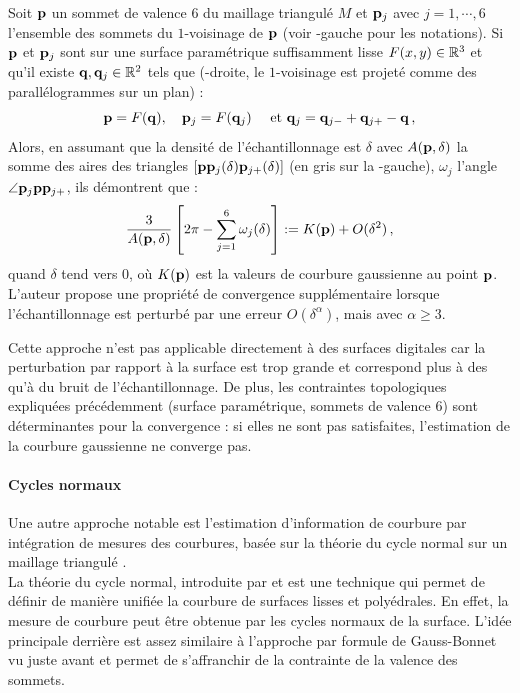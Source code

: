 Soit $\mathbf{p}$ un sommet de valence $6$ du maillage triangulé $M$ et $\mathbf{p}_j$ avec
$j = 1,\cdots, 6$ l'ensemble des sommets du $1$-voisinage de $\mathbf{p}$ (voir
-gauche pour les notations). Si $\mathbf{p}$ et $\mathbf{p}_j$
sont sur une surface paramétrique suffisamment lisse $F(x,y) \in \mathbb{R}^3$ et
qu'il existe $\mathbf{q}, \mathbf{q}_j \in \mathbb{R}^2$ tels que
(-droite, le $1$-voisinage est projeté comme des
parallélogrammes sur un plan) :
%
\begin{equation}
  \mathbf{p}=F(\mathbf{q}), \quad \mathbf{p}_j=F(\mathbf{q}_j) \quad \text{~et~} \mathbf{q}_j=\mathbf{q}_{j-} + \mathbf{q}_{j+} - \mathbf{q} \,,
\end{equation}
%
Alors, en assumant que la densité de l’échantillonnage est $\delta$ avec $A(\mathbf{p}, \delta)$ la somme des aires des triangles
$[\mathbf{p}\mathbf{p}_j(\delta)\mathbf{p}_{j+}(\delta)]$ (en gris sur la
-gauche), $\omega_j$ l'angle $\angle
\mathbf{p}_j\mathbf{p}\mathbf{p}_{j+}$, ils démontrent que :
%
\begin{equation}
  \frac{3}{A(\mathbf{p},\delta)} \left[ 2\pi - \sum \limits^6_{j=1} \omega_j(\delta) \right] := K(\mathbf{p}) + O(\delta^2) \,,
\end{equation}
%
quand $\delta$ tend vers $0$, où $K(\mathbf{p})$ est la valeurs de courbure
gaussienne au point $\mathbf{p}$.
%
\\
%
L'auteur propose une propriété de convergence supplémentaire lorsque
l'échantillonnage est perturbé par une erreur $O(\delta^\alpha)$, mais avec
$\alpha \ge 3$.


Cette approche n'est pas applicable directement à des surfaces digitales car la
perturbation par rapport à la surface est trop grande et
correspond plus à des  qu'à du bruit de l'échantillonnage. De
plus, les contraintes topologiques expliquées précédemment (surface
paramétrique, sommets de valence $6$) sont déterminantes pour la convergence :
si elles ne sont pas satisfaites, l'estimation de la courbure gaussienne ne
converge pas.
%
\paragraph{Cycles normaux}
%
Une autre approche notable est l'estimation d'information de courbure par
intégration de mesures des courbures, basée sur la théorie du cycle normal sur
un maillage triangulé \cite{CohenSteiner2003,CohenSteiner2006}.
%
\\
%
La théorie du cycle normal, introduite par  et
 est une technique qui permet de définir de manière
unifiée la courbure de surfaces lisses et polyédrales. En effet, la mesure de
courbure peut être obtenue par les cycles normaux de la surface. L'idée
principale derrière est assez similaire à l'approche par formule de Gauss-Bonnet
vu juste avant et permet de s'affranchir de la contrainte de la valence des
sommets.


